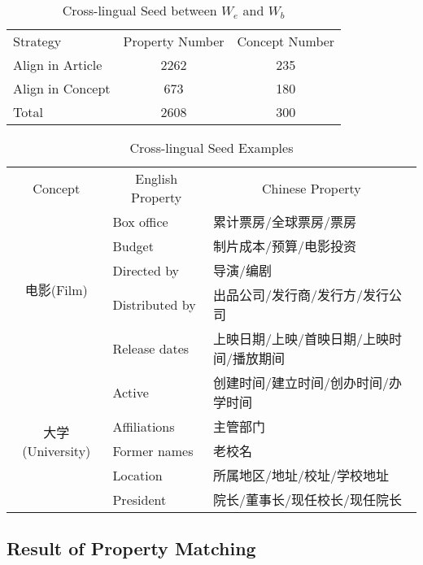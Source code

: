 \documentclass[runningheads,a4paper]{llncs}
\begin{document}
\begin{table}[htb]
  \centering
  \caption{Cross-lingual Seed between $W_e$ and $W_b$}
  \label{tab:cross-lingual-seed}
    \begin{tabular}{lcc}
      {Strategy} & {Property Number} & {Concept Number} \\
      Align in Article & 2262  & 235 \\
      Align in Concept & 673   & 180 \\
      Total       & 2608  & 300 \\
    \end{tabular}
\end{table}

\begin{table}[htb]
  \centering
  \caption{Cross-lingual Seed Examples}
  \label{tab:cross-lingual-seed-examples}
    \begin{tabular}{cll}
      {Concept} & \multicolumn{1}{c}{English Property} & \multicolumn{1}{c}{Chinese Property} \\
      \multirow{5}{*}{电影(Film)}
      & Box office     & 累计票房/全球票房/票房  \\
      & Budget         & 制片成本/预算/电影投资  \\
      & Directed by    & 导演/编剧                        \\
      & Distributed by & 出品公司/发行商/发行方/发行公司  \\
      & Release dates  & 上映日期/上映/首映日期/上映时间/播放期间  \\
      \multirow{5}{*}{大学(University)}
      & Active       & 创建时间/建立时间/创办时间/办学时间  \\
      & Affiliations & 主管部门  \\
      & Former names & 老校名  \\
      & Location     & 所属地区/地址/校址/学校地址  \\
      & President    & 院长/董事长/现任校长/现任院长 \\
    \end{tabular}
\end{table}

\subsection{Result of Property Matching}
\end{document}
